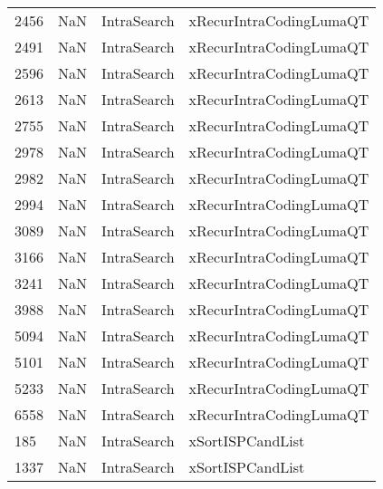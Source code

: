 \begin{tabular}{llll}
2456 &                   NaN &                IntraSearch &                   xRecurIntraCodingLumaQT \\
2491 &                   NaN &                IntraSearch &                   xRecurIntraCodingLumaQT \\
2596 &                   NaN &                IntraSearch &                   xRecurIntraCodingLumaQT \\
2613 &                   NaN &                IntraSearch &                   xRecurIntraCodingLumaQT \\
2755 &                   NaN &                IntraSearch &                   xRecurIntraCodingLumaQT \\
2978 &                   NaN &                IntraSearch &                   xRecurIntraCodingLumaQT \\
2982 &                   NaN &                IntraSearch &                   xRecurIntraCodingLumaQT \\
2994 &                   NaN &                IntraSearch &                   xRecurIntraCodingLumaQT \\
3089 &                   NaN &                IntraSearch &                   xRecurIntraCodingLumaQT \\
3166 &                   NaN &                IntraSearch &                   xRecurIntraCodingLumaQT \\
3241 &                   NaN &                IntraSearch &                   xRecurIntraCodingLumaQT \\
3988 &                   NaN &                IntraSearch &                   xRecurIntraCodingLumaQT \\
5094 &                   NaN &                IntraSearch &                   xRecurIntraCodingLumaQT \\
5101 &                   NaN &                IntraSearch &                   xRecurIntraCodingLumaQT \\
5233 &                   NaN &                IntraSearch &                   xRecurIntraCodingLumaQT \\
6558 &                   NaN &                IntraSearch &                   xRecurIntraCodingLumaQT \\
185  &                   NaN &                IntraSearch &                          xSortISPCandList \\
1337 &                   NaN &                IntraSearch &                          xSortISPCandList \\

\end{tabular}
